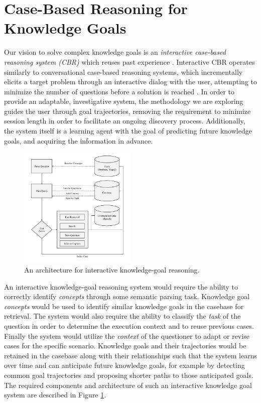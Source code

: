 \documentclass[11pt,letterpaper]{article}
\begin{document}
\section{Case-Based Reasoning for Knowledge Goals}

Our vision to solve complex knowledge goals is an \textit{interactive case-based reasoning system (CBR)} which reuses past experience \cite{kolodner_case-based_1993,lopez_de_mantaras_retrieval_2005}. Interactive CBR operates similarly to conversational case-based reasoning systems, which incrementally elicits a target problem through an interactive dialog with the user, attempting to minimize the number of questions before a solution is reached \cite{aha_advances_2005}. In order to provide an adaptable, investigative system, the methodology we are exploring guides the user through goal trajectories, removing the requirement to minimize session length in order to facilitate an ongoing discovery process. Additionally, the system itself is a learning agent with the goal of predicting future knowledge goals, and acquiring the information in advance.

\begin{figure}
	\centering
	    \includegraphics[width=0.5\textwidth]{figures/architecture.png}
    \caption{\label{fig:architecture.png}An architecture for interactive knowledge-goal reasoning.}
\end{figure}

An interactive knowledge-goal reasoning system would require the ability to correctly identify \textit{concepts} through some semantic parsing task. Knowledge goal \textit{concepts} would be used to identify similar knowledge goals in the casebase for retrieval. The system would also require the ability to classify the \textit{task} of the question in order to determine the execution context and to reuse previous cases. Finally the system would utilize the \textit{context} of the questioner to adapt or revise cases for the specific scenario. Knowledge goals and their trajectories would be retained in the casebase along with their relationships such that the system learns over time and can anticipate future knowledge goals, for example by detecting common goal trajectories and proposing shorter paths to those anticipated goals. The required components and architecture of such an interactive knowledge goal system are described in Figure \ref{fig:architecture.png}.
\end{document}
